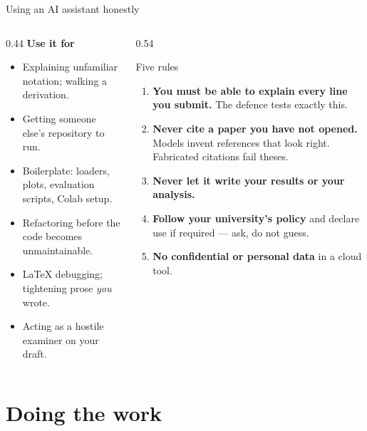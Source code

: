 \documentclass[aspectratio=169,11pt]{beamer}
\newcommand{\key}[1]{\textbf{\color{brand}#1}}
\begin{document}
\begin{frame}{Using an AI assistant honestly}
\begin{columns}[T]
\begin{column}{0.44\textwidth}
\textbf{Use it for}
\footnotesize
\begin{itemize}
  \item Explaining unfamiliar notation; walking a derivation.
  \item Getting someone else's repository to run.
  \item Boilerplate: loaders, plots, evaluation scripts, Colab setup.
  \item Refactoring before the code becomes unmaintainable.
  \item LaTeX debugging; tightening prose \emph{you} wrote.
  \item Acting as a hostile examiner on your draft.
\end{itemize}
\end{column}
\begin{column}{0.54\textwidth}
\begin{alertblock}{Five rules}
\footnotesize
\begin{enumerate}
  \item \key{You must be able to explain every line you submit.} The defence
        tests exactly this.
  \item \key{Never cite a paper you have not opened.} Models invent references
        that look right. Fabricated citations fail theses.
  \item \key{Never let it write your results or your analysis.}
  \item \key{Follow your university's policy} and declare use if required ---
        ask, do not guess.
  \item \key{No confidential or personal data} in a cloud tool.
\end{enumerate}
\end{alertblock}
\end{column}
\end{columns}
\end{frame}

\section{Doing the work}
\end{document}
